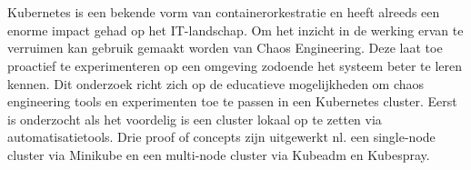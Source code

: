 
%
%

%



\chapter*{}

Kubernetes is een bekende vorm van containerorkestratie en heeft alreeds een enorme impact gehad op het IT-landschap. Om het inzicht in de werking ervan te verruimen kan gebruik gemaakt worden van Chaos Engineering. Deze laat toe proactief te experimenteren op een omgeving zodoende het systeem beter te leren kennen. Dit onderzoek richt zich op de educatieve mogelijkheden om chaos engineering tools en experimenten toe te passen in een Kubernetes cluster. Eerst is onderzocht als het voordelig is een cluster lokaal op te zetten via automatisatietools. Drie proof of concepts zijn uitgewerkt nl. een single-node cluster via Minikube en een multi-node cluster via Kubeadm en Kubespray.    
 
